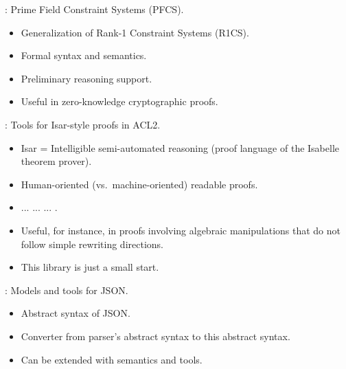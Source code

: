 
\begin{frame}

\newlibtitle

:
Prime Field Constraint Systems (PFCS).
\begin{itemize}
\item Generalization of Rank-1 Constraint Systems (R1CS).
\item Formal syntax and semantics.
\item Preliminary reasoning support.
\item Useful in zero-knowledge cryptographic proofs.
\end{itemize}

\end{frame}


\begin{frame}

\newlibtitle

:
Tools for Isar-style proofs in ACL2.
\begin{itemize}
\item Isar = Intelligible semi-automated reasoning
      (proof language of the Isabelle theorem prover).
\item Human-oriented (vs.\ machine-oriented) readable proofs.
\item {} ...  ...  ... .
\item Useful, for instance, in proofs involving algebraic manipulations
      that do not follow simple rewriting directions.
\item This library is just a small start.
\end{itemize}

\end{frame}


\begin{frame}

\newlibtitle

:
Models and tools for JSON.
\begin{itemize}
\item Abstract syntax of JSON.
\item Converter from parser's abstract syntax to this abstract syntax.
\item Can be extended with semantics and tools.
\end{itemize}

\end{frame}

